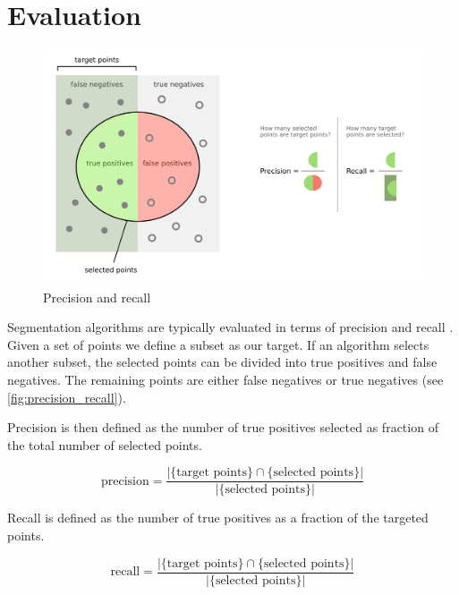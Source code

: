 \section{Evaluation}

\begin{figure}[ht]
  \centering
  \includegraphics[width=1\linewidth]{images/precision_recall.png}
  \caption[Precision and recall]{Precision and recall \protect\footnotemark } 
  \label{fig:precision_recall}
\end{figure}

Segmentation algorithms are typically evaluated in terms of precision and recall \cite{Ponce2012}. Given a set of points we define a subset as our target. If an algorithm selects another subset, the selected points can be divided into true positives and false negatives. The remaining points are either false negatives or true negatives (see \autoref{fig:precision_recall}).

Precision is then defined as the number of true positives selected as fraction of the total number of selected points.

\begin{equation} \label{eq:precision}
	\text{precision}=\frac{|\{\text{target points}\}\cap\{\text{selected points}\}|}{|\{\text{selected points}\}|}
\end{equation}

Recall is defined as the number of true positives as a fraction of the targeted points.

\begin{equation} \label{eq:recall}
	\text{recall}=\frac{|\{\text{target points}\}\cap\{\text{selected points}\}|}{|\{\text{selected points}\}|}
\end{equation}

